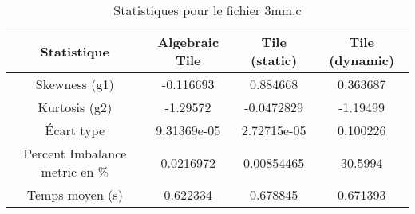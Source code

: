 \documentclass{article}
\begin{document}
\begin{table}[htbp]
  \centering
  \caption{Statistiques pour le fichier 3mm.c}
  \begin{tabular}{|c|c|c|c|}
    \hline
    Statistique & Algebraic Tile & Tile (static) & Tile (dynamic) \\ 
    \hline
    Skewness (g1) & -0.116693 & 0.884668 & 0.363687 \\ 
    Kurtosis (g2) & -1.29572 & -0.0472829 & -1.19499 \\ 
    Écart type & 9.31369e-05 & 2.72715e-05 & 0.100226\\ 
    Percent Imbalance metric en \% & 0.0216972 & 0.00854465 & 30.5994\\ 
    Temps moyen (s) & 0.622334 & 0.678845 & 0.671393 \\ 
    \hline
  \end{tabular}
\end{table}
\newpage
\end{document}
